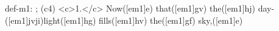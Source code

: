 def-m1: \grealign;
(c4) <c>1.</c> Now([em1]e) that([em1]gv) the([em1]hj) day-([em1]jvji)light([em1]hg) fills([em1]hv) the([em1]gf) sky,([em1]e)
